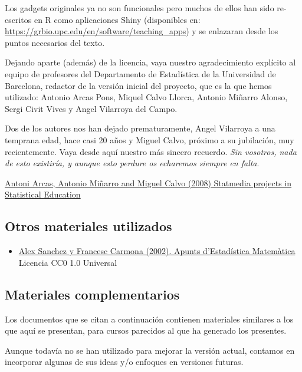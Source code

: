 \documentclass[
]{article}
\providecommand{\tightlist}{%
  \setlength{\itemsep}{0pt}\setlength{\parskip}{0pt}}
\begin{document}
Los gadgets originales ya no son funcionales pero muchos de ellos han sido re-escritos en R como aplicaciones Shiny (disponibles en: \url{https://grbio.upc.edu/en/software/teaching_apps}) y se enlazaran desde los puntos necesarios del texto.

Dejando aparte (además) de la licencia, vaya nuestro agradecimiento explícito al equipo de profesores del Departamento de Estadística de la Universidad de Barcelona, redactor de la versión inicial del proyecto, que es la que hemos utilizado: Antonio Arcas Pons, Miquel Calvo Llorca, Antonio Miñarro Alonso, Sergi Civit Vives y Angel Vilarroya del Campo.

Dos de los autores nos han dejado prematuramente, Angel Vilarroya a una temprana edad, hace casi 20 años y Miguel Calvo, próximo a su jubilación, muy recientemente. Vaya desde aquí nuestro más sincero recuerdo. \emph{Sin vosotros, nada de esto existiría, y aunque esto perdure os echaremos siempre en falta}.

\href{https://www.emis.de/journals/BEIO/files/BEIOv25n1_HE_A.Arcas+A.Minarro+M.Calvo.pdf}{Antoni Arcas, Antonio Miñarro and Miguel Calvo (2008) Statmedia projects in Statistical Education}

\subsection*{Otros materiales utilizados}\label{otros-materiales-utilizados}

\begin{itemize}
\tightlist
\item
  \href{https://github.com/ASPteaching/ApuntsEstadisticaMatematica}{Alex Sanchez y Francesc Carmona (2002). Apunts d'Estadística Matemàtica} Licencia CC0 1.0 Universal
\end{itemize}

\subsection*{Materiales complementarios}\label{materiales-complementarios}

Los documentos que se citan a continuación contienen materiales similares a los que aquí se presentan, para cursos parecidos al que ha generado los presentes.

Aunque todavía no se han utilizado para mejorar la versión actual, contamos en incorporar algunas de sus ideas y/o enfoques en versiones futuras.
\end{document}

